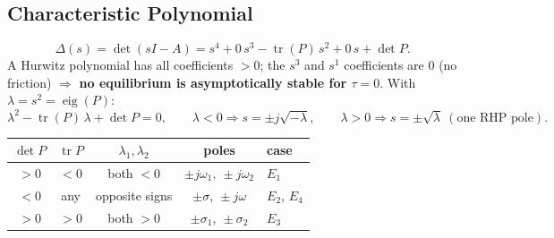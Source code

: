 \documentclass[10pt,letterpaper]{article}
\newenvironment{keep}{\par\noindent\begin{minipage}{\linewidth}}{\end{minipage}\par\smallskip}
\begin{document}
\begin{keep}
\subsection{Characteristic Polynomial}
\begin{equation}
\Delta(s)=\det(sI-A)=s^4+\boxed{0}\,s^3-\operatorname{tr}(P)\,s^2+\boxed{0}\,s+\det P .\label{eq:delta}
\end{equation}
A Hurwitz polynomial has all coefficients $>0$; the $s^3$ and $s^1$ coefficients are $0$ (no friction) $\Rightarrow$ \textbf{no equilibrium is asymptotically stable for $\tau=0$}. With $\lambda=s^2=\operatorname{eig}(P)$:
\begin{equation}
\lambda^2-\operatorname{tr}(P)\,\lambda+\det P=0,\qquad
\lambda<0\Rightarrow s=\pm j\sqrt{-\lambda},\qquad \lambda>0\Rightarrow s=\pm\sqrt{\lambda}\ (\text{one RHP pole}).\label{eq:lam}
\end{equation}
\begin{center}
\label{tab:cases}
\footnotesize\setlength{\tabcolsep}{8pt}\renewcommand{\arraystretch}{0.95}
\begin{tabular}{@{}ccccl@{}}
\toprule
$\det P$ & $\operatorname{tr}P$ & $\lambda_1,\lambda_2$ & poles & case\\
\midrule
$>0$ & $<0$ & both $<0$ & $\pm j\omega_1,\ \pm j\omega_2$ & $E_1$\\
$<0$ & any & opposite signs & $\pm\sigma,\ \pm j\omega$ & $E_2$, $E_4$\\
$>0$ & $>0$ & both $>0$ & $\pm\sigma_1,\ \pm\sigma_2$ & $E_3$\\
\bottomrule
\end{tabular}
\end{center}
\end{keep}
\end{document}
